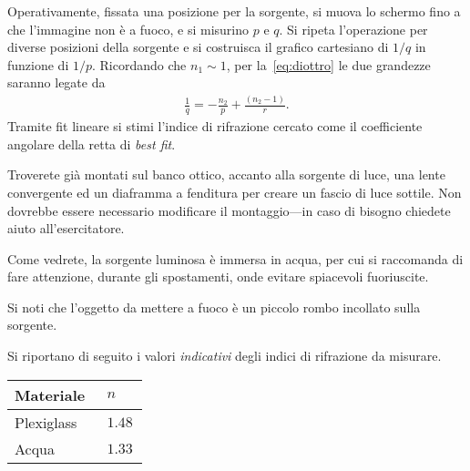 \documentclass{lab1-article}
\begin{document}
\begin{article}
Operativamente, fissata una posizione per la sorgente, si muova lo schermo fino
a che l'immagine non \`e a fuoco, e si misurino $p$ e $q$. Si ripeta
l'operazione per diverse posizioni della sorgente e si costruisca il grafico
cartesiano di $1/q$ in funzione di $1/p$.
Ricordando che $n_1 \sim 1$, per la~\eqref{eq:diottro} le due grandezze saranno
legate da
\begin{align}
  \frac{1}{q} = -\frac{n_2}{p} + \frac{(n_2 - 1)}{r}.
\end{align}
Tramite fit lineare si stimi l'indice di rifrazione cercato come il
coefficiente angolare della retta di \emph{best fit}.


\secconsiderations


Troverete gi\`a montati sul banco ottico, accanto alla sorgente di luce, una
lente convergente ed un diaframma a fenditura per creare un fascio di luce
sottile. Non dovrebbe essere necessario modificare il montaggio---in caso di
bisogno chiedete aiuto all'esercitatore.



Come vedrete, la sorgente luminosa \`e immersa in acqua, per cui si raccomanda
di fare attenzione, durante gli spostamenti, onde evitare spiacevoli
fuoriuscite.

Si noti che l'oggetto da mettere a fuoco \`e un piccolo rombo incollato sulla
sorgente.



Si riportano di seguito i valori \emph{indicativi} degli indici di rifrazione
da misurare.

\medskip

\begin{center}
\begin{tabular}{p{0.65\linewidth}@{}p{0.3\linewidth}}
\hline
Materiale & $n$\\
\hline
\hline
Plexiglass & $1.48$\\
Acqua & $1.33$\\
\hline
\end{tabular}
\end{center}

\vfill



\onecolumn



\end{article}
\end{document}
